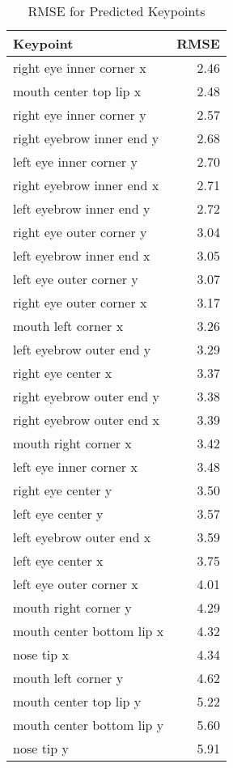 \begin{table}[ht]
\centering
\caption{RMSE for Predicted Keypoints} 
\label{tab:rmse}
\begin{tabular}{lr}
  \hline
Keypoint & RMSE \\ 
  \hline
right eye inner corner x & 2.46 \\ 
  mouth center top lip x & 2.48 \\ 
  right eye inner corner y & 2.57 \\ 
  right eyebrow inner end y & 2.68 \\ 
  left eye inner corner y & 2.70 \\ 
  right eyebrow inner end x & 2.71 \\ 
  left eyebrow inner end y & 2.72 \\ 
  right eye outer corner y & 3.04 \\ 
  left eyebrow inner end x & 3.05 \\ 
  left eye outer corner y & 3.07 \\ 
  right eye outer corner x & 3.17 \\ 
  mouth left corner x & 3.26 \\ 
  left eyebrow outer end y & 3.29 \\ 
  right eye center x & 3.37 \\ 
  right eyebrow outer end y & 3.38 \\ 
  right eyebrow outer end x & 3.39 \\ 
  mouth right corner x & 3.42 \\ 
  left eye inner corner x & 3.48 \\ 
  right eye center y & 3.50 \\ 
  left eye center y & 3.57 \\ 
  left eyebrow outer end x & 3.59 \\ 
  left eye center x & 3.75 \\ 
  left eye outer corner x & 4.01 \\ 
  mouth right corner y & 4.29 \\ 
  mouth center bottom lip x & 4.32 \\ 
  nose tip x & 4.34 \\ 
  mouth left corner y & 4.62 \\ 
  mouth center top lip y & 5.22 \\ 
  mouth center bottom lip y & 5.60 \\ 
  nose tip y & 5.91 \\ 
   \hline
\end{tabular}
\end{table}
